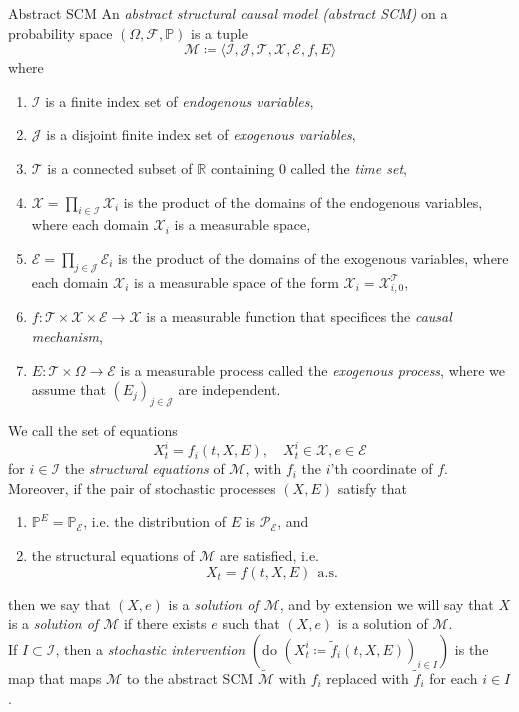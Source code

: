 \documentclass[11pt, a4paper]{memoir}
\theoremstyle{break}
\theoremstyle{break}
\theoremstyle{nonumberplain}
\newcommand{\mR}{\mathbb{R}}
\newcommand{\mP}{\mathbb{P}}
\begin{document}
\begin{mydefinition}{Abstract SCM}
An \emph{abstract structural causal model (abstract SCM)} on a probability space $(\Omega,\mathcal{F},\mP)$ is a tuple
$$\mathcal{M}\coloneqq \langle \mathcal{I},\mathcal{J},\mathcal{T},\mathcal{X},\mathcal{E},f,E\rangle$$
where
\begin{enumerate}[label=\arabic*.]
	\item $\mathcal{I}$ is a finite index set of \emph{endogenous variables},
	\item $\mathcal{J}$ is a disjoint finite index set of \emph{exogenous variables},
	\item $\mathcal{T}$ is a connected subset of $\mR$ containing 0 called the \emph{time set},
	\item $\mathcal{X}=\prod_{i\in \mathcal{I}}\mathcal{X}_i$ is the product of the domains of the endogenous variables, where each domain $\mathcal{X}_i$ is a measurable space,
	\item $\mathcal{E}=\prod_{j\in \mathcal{J}}\mathcal{E}_i$ is the product of the domains of the exogenous variables, where each domain $\mathcal{X}_i$ is a measurable space of the form $\mathcal{X}_i=\mathcal{X}_{i,0}^{\mathcal{T}}$,
	\item $f:\mathcal{T}\times \mathcal{X}\times \mathcal{E}\to\mathcal{X}$ is a measurable function that specifices the \emph{causal mechanism},
	\item $E:\mathcal{T}\times \Omega\to \mathcal{E}$ is a measurable process called the \emph{exogenous process}, where we assume that $(E_j)_{j\in \mathcal{J}}$ are independent.
\end{enumerate}
We call the set of equations
$$X_t^i=f_i(t,X,E),\quad X_t^i\in \mathcal{X},e\in \mathcal{E}$$
for $i\in \mathcal{I}$ the \emph{structural equations} of $\mathcal{M}$, with $f_i$ the $i$'th coordinate of $f$.\\[5pt]
Moreover, if the pair of stochastic processes $(X,E)$ satisfy that
\begin{enumerate}[label=\roman*.]
	\item $\mP^E=\mP_\mathcal{E}$, i.e. the distribution of $E$ is $\mathcal{P}_\mathcal{E}$, and
	\item the structural equations of $\mathcal{M}$ are satisfied, i.e.
	$$X_t=f(t,X,E)\ \ \text{a.s.}$$
\end{enumerate}
then we say that $(X,e)$ is a \emph{solution of $\mathcal{M}$}, and by extension we will say that $X$ is a \emph{solution of $\mathcal{M}$} if there exists $e$ such that $(X,e)$ is a solution of $\mathcal{M}$.\\[5pt]
If  $I\subset \mathcal{I}$, then a \emph{stochastic intervention} $(\text{do } (X_t^i\coloneqq \tilde{f}_i(t,X,E))_{i\in I})$ is the map that maps $\mathcal{M}$ to the abstract SCM $\tilde{\mathcal{M}}$ with $f_i$ replaced with $\tilde{f}_i$ for each $i\in I$.
\end{mydefinition}
\end{document}
